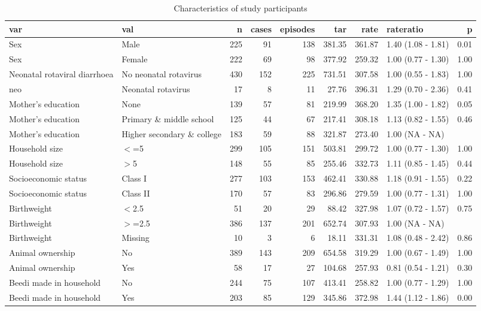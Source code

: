 \documentclass[11pt,a4paper,twoside]{article}\usepackage{graphicx, color}
\begin{document}
\begin{sidewaystable}[ht]
\centering
\begin{tabular}{llrrrrrlr}
  \toprule
var & val & n & cases & episodes & tar & rate & rateratio & p \\ 
  \midrule
Sex & Male & 225 & 91 & 138 & 381.35 & 361.87 & 1.40 (1.08 - 1.81) & 0.01 \\ 
  Sex & Female & 222 & 69 & 98 & 377.92 & 259.32 & 1.00 (0.77 - 1.30) & 1.00 \\ 
  Neonatal rotaviral diarrhoea & No neonatal rotavirus & 430 & 152 & 225 & 731.51 & 307.58 & 1.00 (0.55 - 1.83) & 1.00 \\ 
  neo & Neonatal rotavirus & 17 & 8 & 11 & 27.76 & 396.31 & 1.29 (0.70 - 2.36) & 0.41 \\ 
  Mother's education & None & 139 & 57 & 81 & 219.99 & 368.20 & 1.35 (1.00 - 1.82) & 0.05 \\ 
  Mother's education & Primary \& middle school & 125 & 44 & 67 & 217.41 & 308.18 & 1.13 (0.82 - 1.55) & 0.46 \\ 
  Mother's education & Higher secondary \& college & 183 & 59 & 88 & 321.87 & 273.40 & 1.00 (NA - NA) &  \\ 
  Household size & $<$=5 & 299 & 105 & 151 & 503.81 & 299.72 & 1.00 (0.77 - 1.30) & 1.00 \\ 
  Household size & $>$5 & 148 & 55 & 85 & 255.46 & 332.73 & 1.11 (0.85 - 1.45) & 0.44 \\ 
  Socioeconomic status & Class I & 277 & 103 & 153 & 462.41 & 330.88 & 1.18 (0.91 - 1.55) & 0.22 \\ 
  Socioeconomic status & Class II & 170 & 57 & 83 & 296.86 & 279.59 & 1.00 (0.77 - 1.31) & 1.00 \\ 
  Birthweight & $<$2.5 & 51 & 20 & 29 & 88.42 & 327.98 & 1.07 (0.72 - 1.57) & 0.75 \\ 
  Birthweight & $>$=2.5 & 386 & 137 & 201 & 652.74 & 307.93 & 1.00 (NA - NA) &  \\ 
  Birthweight & Missing & 10 & 3 & 6 & 18.11 & 331.31 & 1.08 (0.48 - 2.42) & 0.86 \\ 
  Animal ownership & No & 389 & 143 & 209 & 654.58 & 319.29 & 1.00 (0.67 - 1.49) & 1.00 \\ 
  Animal ownership & Yes & 58 & 17 & 27 & 104.68 & 257.93 & 0.81 (0.54 - 1.21) & 0.30 \\ 
  Beedi made in household & No & 244 & 75 & 107 & 413.41 & 258.82 & 1.00 (0.77 - 1.29) & 1.00 \\ 
  Beedi made in household & Yes & 203 & 85 & 129 & 345.86 & 372.98 & 1.44 (1.12 - 1.86) & 0.00 \\ 
   \bottomrule
\end{tabular}
\caption{Characteristics of study participants} 
\label{epic}
\end{sidewaystable}
\end{document}
